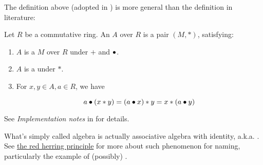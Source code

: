 \begin{remark}
    \label{mk:AlgebraLiterature}

    The definition above (adopted in \Mathlib) is more general than the definition in literature:

    Let $R$ be a commutative ring. An  $A$ over $R$ is a pair $(M, *)$, satisfying:

    \begin{enumerate}
    \item $A$ is a  $M$ over $R$ under $+$ and $\bullet$.

    \item $A$ is a  under $*$.

    \item For $x, y \in A, a \in R$, we have
    
    $$
    a \bullet (x * y) = (a \bullet x) * y = x * (a \bullet y)
    $$

    \end{enumerate}

    See \emph{Implementation notes} in  for details.
    
\end{remark}

\begin{remark}
    \label{mk:AlgebraName}

    What's simply called algebra is actually associative algebra with identity, a.k.a. . See
    \href{https://ncatlab.org/nlab/show/red%20herring%20principle}{the red herring principle}
    for more about such phenomenon for naming, particularly the example of (possibly) .
    
\end{remark}

